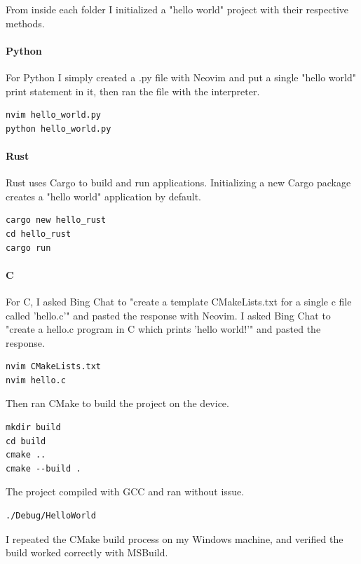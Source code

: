 \documentclass[12pt]{article}
\begin{document}
From inside each folder I initialized a "hello world" project with their respective methods.

\paragraph{Python}
For Python I simply created a .py file with Neovim and put a single "hello world" print statement in it, then ran the file with the interpreter.

\begin{lstlisting}
nvim hello_world.py
python hello_world.py
\end{lstlisting}

\paragraph{Rust}
Rust uses Cargo to build and run applications. Initializing a new Cargo package creates a "hello world" application by default.

\begin{lstlisting}
cargo new hello_rust
cd hello_rust
cargo run
\end{lstlisting}

\paragraph{C}
For C, I asked Bing Chat to "create a template CMakeLists.txt for a single c file called 'hello.c'" and pasted the response with Neovim.
I asked Bing Chat to "create a hello.c program in C which prints 'hello world!'" and pasted the response.

\begin{lstlisting}
nvim CMakeLists.txt
nvim hello.c
\end{lstlisting}

Then ran CMake to build the project on the device.

\begin{lstlisting}
mkdir build
cd build
cmake ..
cmake --build .
\end{lstlisting}

The project compiled with GCC and ran without issue.

\begin{lstlisting}
./Debug/HelloWorld
\end{lstlisting}

I repeated the CMake build process on my Windows machine, and verified the build worked correctly with MSBuild.
\end{document}
